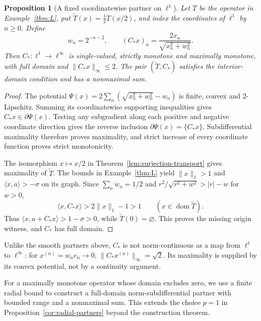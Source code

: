 \documentclass[11pt]{article}
\newcommand{\dom}{\operatorname{dom}}
\newcommand{\pair}[2]{\langle #1,#2\rangle}
\newtheorem{proposition}{Proposition}
\theoremstyle{definition}
\theoremstyle{remark}
\begin{document}
\begin{proposition}[A fixed coordinatewise partner on $\ell^1$]
\label{cor:fixed-coordinate-partner}
Let $T$ be the operator in Example~\ref{thm:L}, put $\widetilde T(x)=\frac12T(x/2)$, and index the coordinates of $\ell^1$ by $n\ge0$. Define
\[
w_n=2^{-n-2},\qquad (C_*x)_n=\frac{2x_n}{\sqrt{x_n^2+w_n^2}}.
\]
Then $C_*:\ell^1\to\ell^\infty$ is single-valued, strictly monotone and maximally monotone, with full domain and $\|C_*x\|_\infty\le2$. The pair $(\widetilde T,C_*)$ satisfies the interior-domain condition and has a nonmaximal sum.
\end{proposition}
\begin{proof}
The potential $\Psi(x)=2\sum_n(\sqrt{x_n^2+w_n^2}-w_n)$ is finite, convex and $2$-Lipschitz. Summing its coordinatewise supporting inequalities gives $C_*x\in\partial\Psi(x)$. Testing any subgradient along each positive and negative coordinate direction gives the reverse inclusion $\partial\Psi(x)=\{C_*x\}$. Subdifferential maximality therefore proves maximality, and strict increase of every coordinate function proves strict monotonicity.

The isomorphism $x\mapsto x/2$ in Theorem~\ref{lem:surjection-transport} gives maximality of $\widetilde T$. The bounds in Example~\ref{thm:L} yield $\|x\|_1>1$ and $\pair{x}{a}>-\sigma$ on its graph. Since $\sum_nw_n=1/2$ and $r^2/\sqrt{r^2+w^2}>|r|-w$ for $w>0$,
\[
\pair{x}{C_*x}>2\|x\|_1-1>1\qquad(x\in\dom\widetilde T).
\]
Thus $\pair{x}{a+C_*x}>1-\sigma>0$, while $\widetilde T(0)=\varnothing$. This proves the missing origin witness, and $C_*$ has full domain.
\end{proof}

Unlike the smooth partners above, $C_*$ is not norm-continuous as a map from $\ell^1$ to $\ell^\infty$: for $x^{(n)}=w_ne_n\to0$, $\|C_*x^{(n)}\|_\infty=\sqrt2$. Its maximality is supplied by its convex potential, not by a continuity argument.

For a maximally monotone operator whose domain excludes zero, we use a finite radial bound to construct a full-domain norm-subdifferential partner with bounded range and a nonmaximal sum. This extends the choice $p=1$ in Proposition~\ref{cor:radial-partners} beyond the construction theorem.
\end{document}
